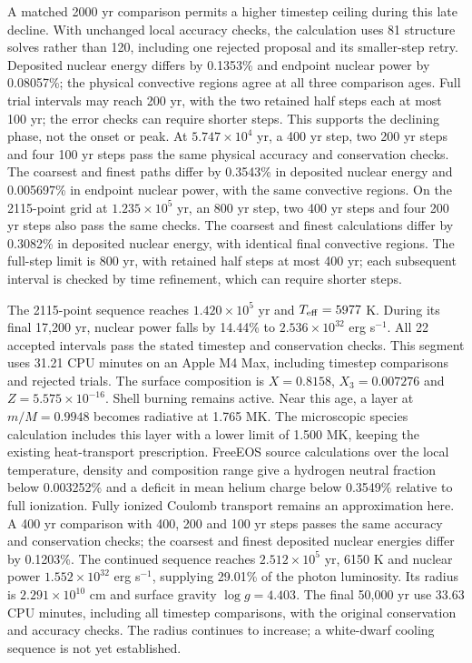 \documentclass[11pt,letterpaper]{article}
\begin{document}
A matched 2000 yr comparison permits a higher timestep ceiling during this
late decline. With unchanged local accuracy checks, the calculation uses
81 structure solves rather than 120, including one rejected proposal and its
smaller-step retry. Deposited nuclear energy differs by 0.1353\% and endpoint
nuclear power by 0.08057\%; the physical convective regions agree at all three
comparison ages. Full trial intervals may reach 200 yr, with the two retained
half steps each at most 100 yr; the error checks can require shorter steps.
This supports the declining phase, not the onset or peak.
At $5.747\times10^4$ yr, a 400 yr step, two 200 yr steps and four 100 yr
steps pass the same physical accuracy and conservation checks. The coarsest
and finest paths differ by 0.3543\% in deposited nuclear energy and
0.005697\% in endpoint nuclear power, with the same convective regions.
On the 2115-point grid at $1.235\times10^5$ yr, an 800 yr step,
two 400 yr steps and four 200 yr steps also pass the same checks.
The coarsest and finest calculations differ by 0.3082\% in deposited nuclear
energy, with identical final convective regions. The full-step limit is
800 yr, with retained half steps at most 400 yr; each subsequent interval
is checked by time refinement, which can require shorter steps.

The 2115-point sequence reaches $1.420\times10^5$ yr and
$T_{\rm eff}=5977$ K. During its final 17,200 yr, nuclear power falls by
14.44\% to $2.536\times10^{32}$ erg s$^{-1}$. All 22 accepted intervals
pass the stated timestep and conservation checks. This segment uses
31.21 CPU minutes on an Apple M4 Max, including timestep comparisons
and rejected trials. The surface composition is $X=0.8158$,
$X_3=0.007276$ and $Z=5.575\times10^{-16}$. Shell burning remains active.
Near this age, a layer at $m/M=0.9948$ becomes radiative at 1.765 MK.
The microscopic species calculation includes this layer with a lower limit
of 1.500 MK, keeping the existing heat-transport prescription.
FreeEOS source calculations over the local temperature, density and composition
range give a hydrogen neutral fraction below 0.003252\% and a deficit in
mean helium charge below 0.3549\% relative to full ionization. Fully ionized
Coulomb transport remains an approximation here. A 400 yr comparison with
400, 200 and 100 yr steps passes the same accuracy and conservation checks;
the coarsest and finest deposited nuclear energies differ by 0.1203\%.
The continued sequence reaches $2.512\times10^5$ yr, 6150 K and nuclear
power $1.552\times10^{32}$ erg s$^{-1}$, supplying 29.01\% of the photon
luminosity. Its radius is $2.291\times10^{10}$ cm and surface gravity
$\log g=4.403$. The final 50,000 yr use 33.63 CPU minutes, including
all timestep comparisons, with the original conservation and accuracy checks.
The radius continues to increase; a white-dwarf cooling sequence is not yet
established.
\end{document}
